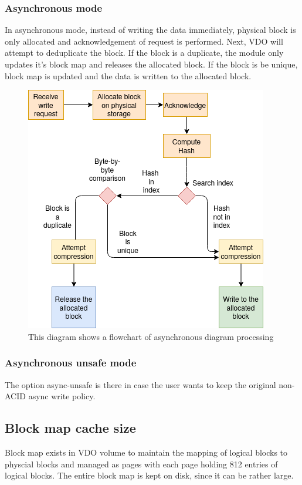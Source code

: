 \documentclass[
  color, %
  table, %
  lof,   %
  lot,   %
]{fithesis3}
\begin{document}
\subsubsection{Asynchronous mode}
In asynchronous mode, instead of writing the data immediately, physical block is only allocated and acknowledgement of request is performed. Next, VDO will attempt to deduplicate the block. If the block is a duplicate, the module only updates it's block map and releases the allocated block. If the block is be unique, block map is updated and the data is written to the allocated block.

\begin{figure}[!htb]
        \centering
        \includegraphics[width=\textwidth]{graphics/diagrams/async.png}
\caption[Asynchronous write mode]{This diagram shows a flowchart of asynchronous diagram processing}
\label{fig:async}
\end{figure}

\subsubsection{Asynchronous unsafe mode}
The option async-unsafe is there in case the user wants to keep the original non-ACID async write policy.


\subsection{Block map cache size}
Block map exists in VDO volume to maintain the mapping of logical blocks to physcial blocks and managed as pages with each page holding 812 entries of logical blocks. The entire block map is kept on disk, since it can be rather large.
\end{document}
